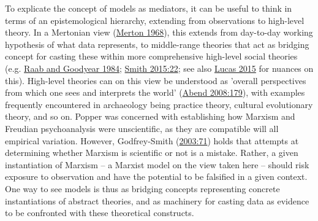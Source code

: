 \documentclass[
  12pt,
  a4paper,
  oneside]{book}
\begin{document}
To explicate the concept of models as mediators, it can be useful to think in terms of an epistemological hierarchy, extending from observations to high-level theory. In a Mertonian view (\protect\hyperlink{ref-merton1968}{Merton 1968}), this extends from day-to-day working hypothesis of what data represents, to middle-range theories that act as bridging concept for casting these within more comprehensive high-level social theories (e.g. \protect\hyperlink{ref-raab1984}{Raab and Goodyear 1984}; \protect\hyperlink{ref-smith2015}{Smith 2015:22}; see also \protect\hyperlink{ref-lucas2015}{Lucas 2015} for nuances on this). High-level theories can on this view be understood as 'overall perspectives from which one sees and interprets the world' (\protect\hyperlink{ref-abend2008}{Abend 2008:179}), with examples frequently encountered in archaeology being practice theory, cultural evolutionary theory, and so on. Popper was concerned with establishing how Marxism and Freudian psychoanalysis were unscientific, as they are compatible will all empirical variation. However, Godfrey-Smith (\protect\hyperlink{ref-godfrey-smith2003}{2003:71}) holds that attempts at determining whether Marxism is scientific or not is a mistake. Rather, a given instantiation of Marxism -- a Marxist model on the view taken here -- should risk exposure to observation and have the potential to be falsified in a given context. One way to see models is thus as bridging concepts representing concrete instantiations of abstract theories, and as machinery for casting data as evidence to be confronted with these theoretical constructs.
\end{document}
